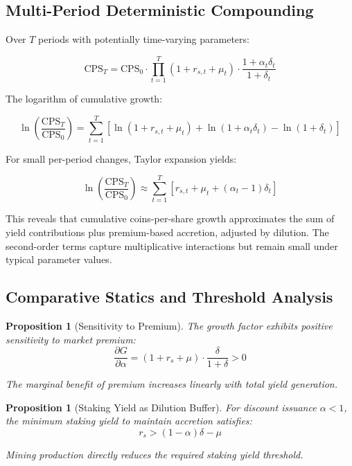 \documentclass[
  journal=medium,
  manuscript=article-type,
  year=2025,
  volume=1,
]{cup-journal}
\newtheorem{proposition}[theorem]{Proposition}
\theoremstyle{definition}
\begin{document}
\subsection{Multi-Period Deterministic Compounding}

Over $T$ periods with potentially time-varying parameters:

\begin{equation}
\text{CPS}_T = \text{CPS}_0 \cdot \prod_{t=1}^{T} (1 + r_{s,t} + \mu_t) \cdot \frac{1 + \alpha_t\delta_t}{1 + \delta_t}
\end{equation}

The logarithm of cumulative growth:

\begin{equation}
\ln\left(\frac{\text{CPS}_T}{\text{CPS}_0}\right) = \sum_{t=1}^{T} \left[ \ln(1 + r_{s,t} + \mu_t) + \ln(1 + \alpha_t\delta_t) - \ln(1 + \delta_t) \right]
\end{equation}

For small per-period changes, Taylor expansion yields:

\begin{equation}
\ln\left(\frac{\text{CPS}_T}{\text{CPS}_0}\right) \approx \sum_{t=1}^{T} \left[ r_{s,t} + \mu_t + (\alpha_t - 1)\delta_t \right]
\end{equation}

This reveals that cumulative coins-per-share growth approximates the sum of yield contributions plus premium-based accretion, adjusted by dilution. The second-order terms capture multiplicative interactions but remain small under typical parameter values.

\subsection{Comparative Statics and Threshold Analysis}

\begin{proposition}[Sensitivity to Premium]
The growth factor exhibits positive sensitivity to market premium:
\begin{equation}
\frac{\partial G}{\partial \alpha} = (1 + r_s + \mu) \cdot \frac{\delta}{1 + \delta} > 0
\end{equation}

The marginal benefit of premium increases linearly with total yield generation.
\end{proposition}

\begin{proposition}[Staking Yield as Dilution Buffer]
For discount issuance $\alpha < 1$, the minimum staking yield to maintain accretion satisfies:
\begin{equation}
r_s > (1 - \alpha)\delta - \mu
\end{equation}

Mining production directly reduces the required staking yield threshold.
\end{proposition}
\end{document}
